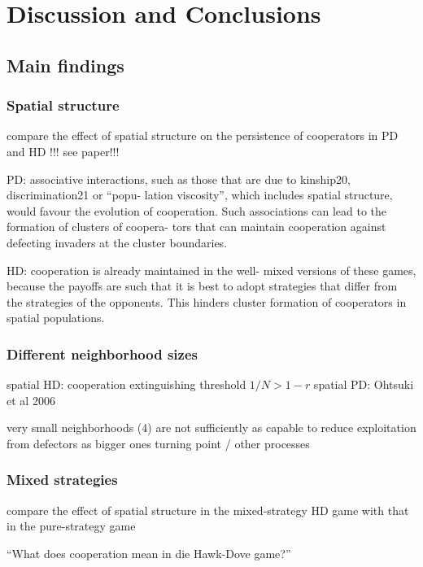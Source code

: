 \section{Discussion and Conclusions}

\subsection{Main findings}

\subsubsection*{Spatial structure}

compare the effect of spatial structure on the persistence of cooperators in PD and HD !!! see paper!!!


PD:
associative interactions,
such as those that are due to kinship20, discrimination21 or “popu-
lation viscosity”, which includes spatial structure, would favour
the evolution of cooperation.
Such associations can lead to the formation of clusters of coopera-
tors that can maintain cooperation against defecting invaders at the
cluster boundaries.


HD:
 cooperation is already maintained in the well-
 mixed versions of these games, because the payoffs are such that it is
 best to adopt strategies that differ from the strategies of the
 opponents. This hinders cluster formation of cooperators in spatial
 populations.


\subsubsection*{Different neighborhood sizes}


spatial HD: cooperation extinguishing threshold $1 / N > 1 - r$
spatial PD: Ohtsuki et al 2006

very small neighborhoods (4) are not sufficiently as capable to reduce exploitation from defectors as bigger ones
turning point / other processes

\subsubsection*{Mixed strategies}

compare the effect of spatial structure in the mixed-strategy HD game with that in the pure-strategy game






``What does cooperation mean in die Hawk-Dove game?''


